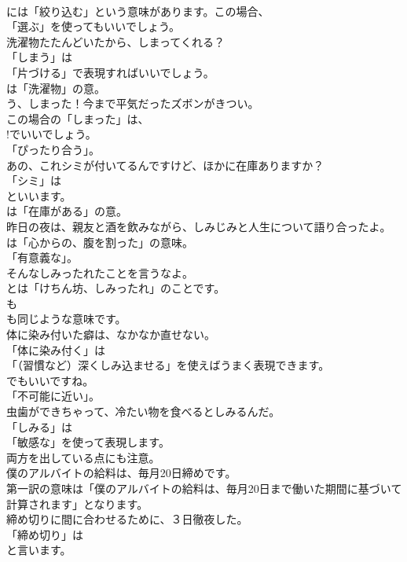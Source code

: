 \documentclass[8pt]{extreport}
\begin{document}
\begin{CJK}{UTF8}{min}
\\	には「絞り込む」という意味があります。この場合、
\\	「選ぶ」を使ってもいいでしょう。	
\\	洗濯物たたんどいたから、しまってくれる？ 
\\	「しまう」は 
\\	「片づける」で表現すればいいでしょう。
\\	は「洗濯物」の意。	
\\	う、しまった！今まで平気だったズボンがきつい。 
\\	この場合の「しまった」は、
\\	!でいいでしょう。
\\	「ぴったり合う」。	
\\	あの、これシミが付いてるんですけど、ほかに在庫ありますか？ 
\\	「シミ」は 
\\	といいます。
\\	は「在庫がある」の意。	
\\	昨日の夜は、親友と酒を飲みながら、しみじみと人生について語り合ったよ。 
\\	は「心からの、腹を割った」の意味。
\\	「有意義な」。	
\\	そんなしみったれたことを言うなよ。 
\\	とは「けちん坊、しみったれ」のことです。
\\	も
\\	も同じような意味です。	
\\	体に染み付いた癖は、なかなか直せない。 
\\	「体に染み付く」は
\\	「（習慣など）深くしみ込ませる」を使えばうまく表現できます。
\\	でもいいですね。
\\	「不可能に近い」。	
\\	虫歯ができちゃって、冷たい物を食べるとしみるんだ。 
\\	「しみる」は
\\	「敏感な」を使って表現します。
\\	両方を出している点にも注意。	
\\	僕のアルバイトの給料は、毎月20日締めです。 
\\	第一訳の意味は「僕のアルバイトの給料は、毎月20日まで働いた期間に基づいて計算されます」となります。	
\\	締め切りに間に合わせるために、３日徹夜した。 
\\	「締め切り」は
\\	と言います。	

\end{CJK}
\end{document}

